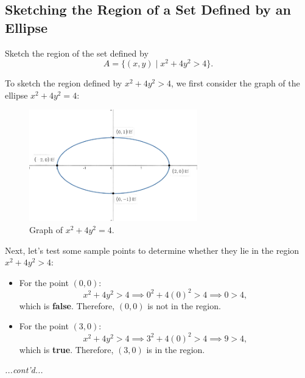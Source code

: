 \documentclass{article}
\begin{document}
\subsection*{Sketching the Region of a Set Defined by an Ellipse}

\begin{examplebox}
Sketch the region of the set defined by
\[
    A = \{ (x, y) \mid x^2 + 4y^2 > 4 \}.
\]

\begin{remarkbox}
    To sketch the region defined by \( x^2 + 4y^2 > 4 \), we first consider the graph of the ellipse \( x^2 + 4y^2 = 4 \):

    \begin{figure}[H]
        \centering
        \includegraphics[width=0.65\textwidth]{graph of x^2 + 4y^2 = 4.png}
        \caption{Graph of \( x^2 + 4y^2 = 4 \).}
        \label{fig:ellipse_graph}
    \end{figure}

    Next, let’s test some sample points to determine whether they lie in the region \( x^2 + 4y^2 > 4 \):

    \begin{itemize}
        \item For the point \( (0, 0) \):
        \[
        x^2 + 4y^2 > 4 \implies 0^2 + 4(0)^2 > 4 \implies 0 > 4,
        \]
        which is \textbf{false}. Therefore, \( (0, 0) \) is not in the region.

        \item For the point \( (3, 0) \):
        \[
        x^2 + 4y^2 > 4 \implies 3^2 + 4(0)^2 > 4 \implies 9 > 4,
        \]
        which is \textbf{true}. Therefore, \( (3, 0) \) is in the region.
    \end{itemize}
\end{remarkbox}

\textit{...cont'd...}
\end{examplebox}
\end{document}
